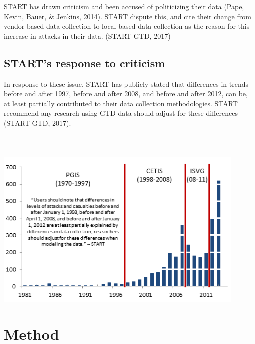 \documentclass[10pt,a4paper]{article}
\begin{document}
START has drawn criticism and been accused of politicizing their data (Pape, Kevin, Bauer, \& Jenkins, 2014). START dispute this, and cite their change from vendor based data collection to local based data collection as the reason for this increase in attacks in their data. (START GTD, 2017)

\subsection{START’s response to criticism }

In response to these issue, START has publicly stated that differences in trends before and after 1997, before and after 2008, and before and after 2012, can be, at least partially contributed to their data collection methodologies. START recommend any research using GTD data should adjust for these differences (START GTD, 2017).
\\\\
\\\\

\includegraphics[width=0.9\textwidth]{backgroundpic2.png}

\newpage



\section{Method}
\end{document}
